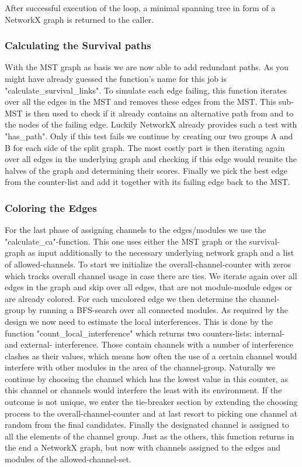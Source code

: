 	After successful execution of the loop, a minimal spanning tree in form of a NetworkX graph is returned to the caller.
	
      \subsubsection{Calculating the Survival paths}
	With the \ac{MST} graph as basis we are now able to add redundant paths. 
	As you might have already guessed the function's name for this job is "calculate\_survival\_links".
	To simulate each edge failing, this function iterates over all the edges in the \ac{MST} and removes these edges from the \ac{MST}.
	This sub-MST is then used to check if it already contains an alternative path from and to the nodes of the failing edge.
	Luckily NetworkX already provides such a test with "has\_path". 
	Only if this test fails we continue by creating our two groups A and B for each side of the split graph.
	The most costly part is then iterating again over all edges in the underlying graph and checking if this edge would reunite the halves of the graph and determining 
	their scores. Finally we pick the best edge from the counter-list and add it together with its failing edge back to the \ac{MST}.
	
      \subsubsection{Coloring the Edges}
	For the last phase of assigning channels to the edges/modules we use the "calculate\_ca"-function. 
	This one uses either the \ac{MST} graph or the survival-graph as input additionally to the necessary underlying network graph and a list of allowed-channels.
	To start we initialize the overall-channel-counter with zeros which tracks overall channel usage in case there are ties.
	We iterate again over all edges in the graph and skip over all edges, that are not module-module edges or are already colored. 
	For each uncolored edge we then determine the channel-group by running a \ac{BFS}-search over all connected modules.
	As required by the design we now need to estimate the local interferences.
	This is done by the function "count\_local\_interference" which returns two counters-lists: internal- and external- interference.
	Those contain channels with a number of interference clashes as their values, 
	which means how often the use of a certain channel would interfere with other modules 
	in the area of the channel-group. Naturally we continue by choosing the channel which has the lowest value in this counter, 
	as this channel or channels would interfere the least 	with its environment. 
	If the outcome is not unique, we enter the tie-breaker section by extending the choosing process to the overall-channel-counter 
	and at last resort to picking one channel at random from the final candidates.
	Finally the designated channel is assigned to all the elements of the channel group.
	Just as the others, this function returns in the end a NetworkX graph, but now with channels assigned to the edges and modules of the allowed-channel-set.	


